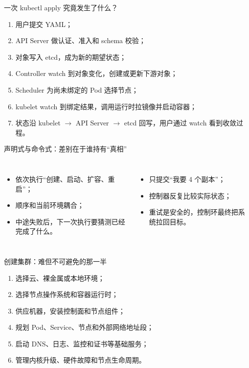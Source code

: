 \documentclass[UTF8,fontset=none,aspectratio=169,10pt]{beamer}
\begin{document}
\begin{frame}{一次 kubectl apply 究竟发生了什么？}
\begin{enumerate}
  \item 用户提交 YAML；
  \item API Server 做认证、准入和 schema 校验；
  \item 对象写入 etcd，成为新的期望状态；
  \item Controller watch 到对象变化，创建或更新下游对象；
  \item Scheduler 为尚未绑定的 Pod 选择节点；
  \item kubelet watch 到绑定结果，调用运行时拉镜像并启动容器；
  \item 状态沿 kubelet $\rightarrow$ API Server $\rightarrow$ etcd 回写，用户通过 watch 看到收敛过程。
\end{enumerate}
\end{frame}

\begin{frame}{声明式与命令式：差别在于谁持有“真相”}
\begin{columns}[T]
\begin{itemize}
  \item 依次执行“创建、启动、扩容、重启”；
  \item 顺序和当前环境耦合；
  \item 中途失败后，下一次执行要猜测已经完成了什么。
\end{itemize}
\begin{itemize}
  \item 只提交“我要 4 个副本”；
  \item 控制器反复比较实际状态；
  \item 重试是安全的，控制环最终把系统拉回目标。
\end{itemize}
\end{columns}
\vfill
{}
\end{frame}

\begin{frame}{创建集群：难但不可避免的那一半}
\begin{enumerate}
  \item 选择云、裸金属或本地环境；
  \item 选择节点操作系统和容器运行时；
  \item 供应机器，安装控制面和节点组件；
  \item 规划 Pod、Service、节点和外部网络地址段；
  \item 启动 DNS、日志、监控和证书等基础服务；
  \item 管理内核升级、硬件故障和节点生命周期。
\end{enumerate}
\vfill
{}
\end{frame}
\end{document}
